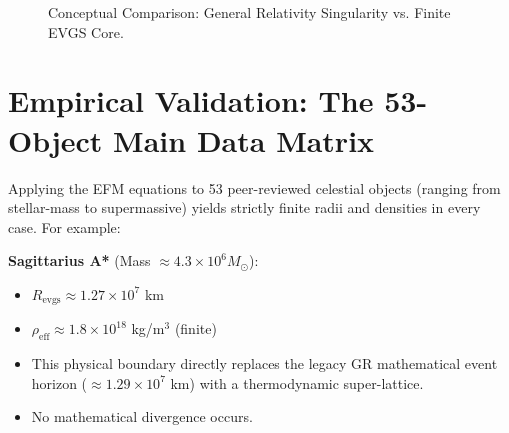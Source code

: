 \documentclass[11pt, a4paper]{article}
\begin{document}
\begin{figure}[!ht]
  \centering
  \caption{Conceptual Comparison: General Relativity Singularity vs. Finite EVGS Core.}
  \label{fig:evgs-vs-singularity}
\end{figure}

\section{Empirical Validation: The 53-Object Main Data Matrix}
  Applying the EFM equations to 53 peer-reviewed celestial objects (ranging from stellar-mass to supermassive) yields strictly finite radii and densities in every case. For example:
  
  \textbf{Sagittarius A*} (Mass $\approx 4.3 \times 10^6 M_\odot$):
  \begin{itemize}
    \item $R_{\text{evgs}} \approx 1.27 \times 10^7$ km
    \item $\rho_{\text{eff}} \approx 1.8 \times 10^{18}$ kg/m$^3$ (finite)
    \item This physical boundary directly replaces the legacy GR mathematical event horizon ($\approx 1.29 \times 10^7$ km) with a thermodynamic super-lattice.
    \item No mathematical divergence occurs.
  \end{itemize}
  
\end{document}
